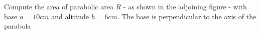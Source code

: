 
%
%
%
%
% 
% 

\question Compute the area of parabolic area $R$ - as shown in the adjoining 
figure - with base $a = 10cm$ and altitude $h=6cm$. The base is perpendicular 
to the axis of the parabola

\insertQR{}


